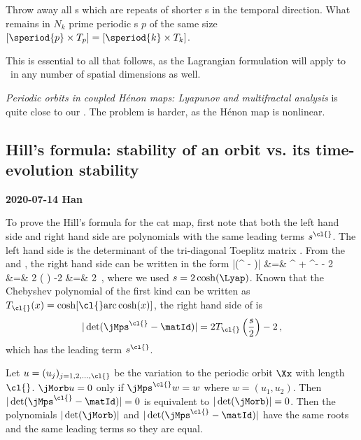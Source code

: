 \begin{description}
{Throw away all {\brick}s which are repeats of
shorter {\brick}s in the temporal direction. What
remains in $N_k$ prime periodic \brick s $p$ of the same size
$[\speriod{p}\times\period{p}]=[\speriod{k}\times\period{k}]$.

This is essential to all that follows, as the Lagrangian formulation will
apply to \catlatt\ in any number of spatial dimensions as well.

  }

 {
  {\em Periodic
orbits in coupled {H{\'e}non} maps: {Lyapunov} and multifractal analysis}
is quite close to our \catlatt. The problem is harder,
as the {H{\'e}non} map is nonlinear.
    }



\end{description}


\subsection{Hill's formula:
             stability of an orbit vs. its time-evolution stability}

{\bf 2020-07-14 Han}

To prove the Hill's formula  for the cat map, first note that both the left hand side and right hand side are polynomials with the same leading terms $s^\cl{}$. The left hand side is the determinant of the tri-diagonal Toeplitz matrix .  From the  and , the right hand side can be written in the form
\bea
|\det(\jMps^{\cl{}} - \matId)|
          &=& \ExpaEig^{\cl{}} + \ExpaEig^{-\cl{}} - 2 \continue
          &=& 2 \cosh( \cl{} \Lyap) -2 \continue
          &=& 2 \cosh {}
          \,,
\label{HillsForRight}
\eea
where we used $s=2\cosh(\Lyap)$. Known that the Chebyshev polynomial of the first kind can be written as $T_\cl{}(x) = \cosh [ \cl{} \textrm{arc}\cosh(x)]$, the right hand side of  is
\[
|\det(\jMps^{\cl{}} - \matId)|
=
2 T_\cl{}\left(\frac{s}{2}\right)-2 \, ,
\]
which has the leading term $s^\cl{}$.

Let $u = (u_j)_{j = 1, 2, \dots, \cl{}}$ be the variation to the periodic orbit $\Xx$ with length $\cl{}$. $\jMorb u = 0$ only if $\jMps^\cl{} w = w$ where $w=(u_1,u_2)$. Then $|\det(\jMps^{\cl{}} - \matId)|=0$ is equivalent to $|\det(\jMorb)|=0$. Then the polynomials $|\det(\jMorb)|$ and $|\det(\jMps^{\cl{}} - \matId)|$ have the same roots and the same leading terms so they are equal.

